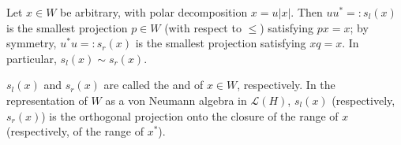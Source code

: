 Let $x \in W$ be arbitrary, with polar decomposition $x = u|x|$. Then $uu^* =: s_l(x)$ is the smallest projection $p \in W$ (with respect to $\leq$) satisfying $px = x$; by symmetry, $u^*u =: s_r(x)$ is the smallest projection satisfying $xq = x$. In particular, $s_l(x) \sim s_r(x)$.

$s_l(x)$ and $s_r(x)$ are called the  and  of $x \in W$, respectively. In the representation of $W$ as a von Neumann algebra in $\mathcal{L}(H)$, $s_l(x)$ (respectively, $s_r(x)$) is the orthogonal projection onto the closure of the range of $x$ (respectively, of the range of $x^*$).
